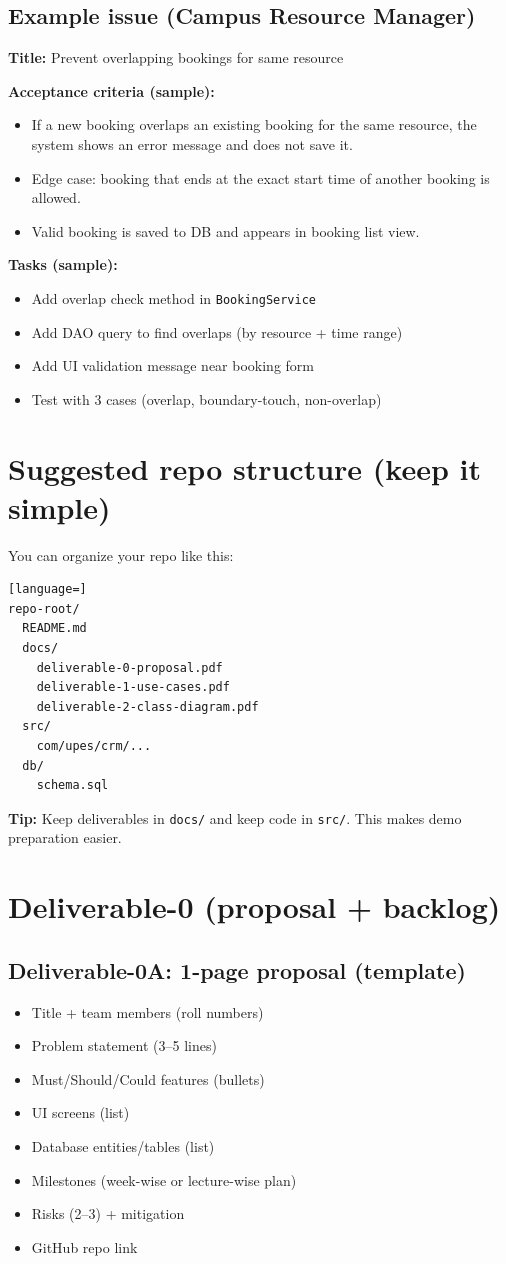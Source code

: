 \documentclass[11pt]{article}
\begin{document}
\subsection{Example issue (Campus Resource Manager)}
\textbf{Title:} Prevent overlapping bookings for same resource\par
\textbf{Acceptance criteria (sample):}
\begin{itemize}
  \item If a new booking overlaps an existing booking for the same resource, the system shows an error message and does not save it.
  \item Edge case: booking that ends at the exact start time of another booking is allowed.
  \item Valid booking is saved to DB and appears in booking list view.
\end{itemize}
\textbf{Tasks (sample):}
\begin{itemize}
  \item Add overlap check method in \texttt{BookingService}
  \item Add DAO query to find overlaps (by resource + time range)
  \item Add UI validation message near booking form
  \item Test with 3 cases (overlap, boundary-touch, non-overlap)
\end{itemize}

\section{Suggested repo structure (keep it simple)}
You can organize your repo like this:
\begin{lstlisting}[language=]
repo-root/
  README.md
  docs/
    deliverable-0-proposal.pdf
    deliverable-1-use-cases.pdf
    deliverable-2-class-diagram.pdf
  src/
    com/upes/crm/...
  db/
    schema.sql
\end{lstlisting}
\textbf{Tip:} Keep deliverables in \texttt{docs/} and keep code in \texttt{src/}. This makes demo preparation easier.

\section{Deliverable-0 (proposal + backlog)}
\subsection*{Deliverable-0A: 1-page proposal (template)}
\begin{itemize}
  \item Title + team members (roll numbers)
  \item Problem statement (3--5 lines)
  \item Must/Should/Could features (bullets)
  \item UI screens (list)
  \item Database entities/tables (list)
  \item Milestones (week-wise or lecture-wise plan)
  \item Risks (2--3) + mitigation
  \item GitHub repo link
\end{itemize}
\end{document}

